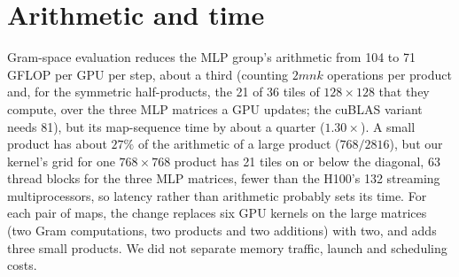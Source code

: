 \documentclass{article}
\begin{document}
\section{Arithmetic and time}\label{app:arith}
Gram-space evaluation reduces the MLP group's arithmetic from 104 to 71 GFLOP per GPU per step, about a third (counting $2mnk$ operations per product and, for the symmetric half-products, the 21 of 36 tiles of $128\times128$ that they compute, over the three MLP matrices a GPU updates; the cuBLAS variant needs 81), but its map-sequence time by about a quarter ($1.30\times$). A small product has about $27\%$ of the arithmetic of a large product ($768/2816$), but our kernel's grid for one $768\times768$ product has 21 tiles on or below the diagonal, 63 thread blocks for the three MLP matrices, fewer than the H100's 132 streaming multiprocessors, so latency rather than arithmetic probably sets its time. For each pair of maps, the change replaces six GPU kernels on the large matrices (two Gram computations, two products and two additions) with two, and adds three small products. We did not separate memory traffic, launch and scheduling costs.
\end{document}

